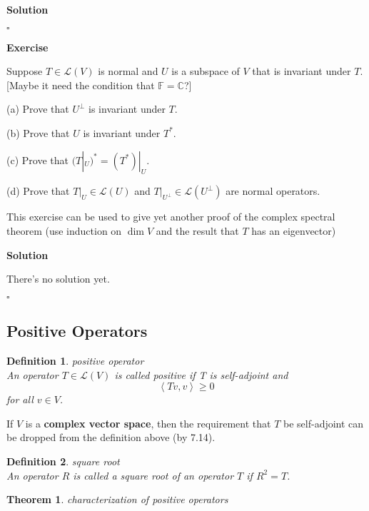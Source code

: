 \documentclass{article}
\newtheorem{theorem}{Theorem}[subsection]
\newtheorem{definition}{Definition}[subsection]
\newenvironment{exercise}{%
{\textbf{Exercise\\}
    }
}{
}
\newenvironment{solution}{%
{
    \textbf{Solution\\}
    }
}{
  \hfill $\square$ 
  \par\bigskip 
}
\newcommand{\CC}{\mathbb{C}}
\newcommand{\FF}{\mathbb{F}}
\begin{document}
\begin{CJK}{UTF8}{gkai}
\begin{solution}
\end{solution}

\begin{exercise}
    Suppose $T \in \mathcal{L}(V)$ is normal and $U$ is a subspace of $V$ that is invariant under $T$. [Maybe it need the condition that $\FF = \CC$?]

    (a) Prove that $U^\bot$ is invariant under $T$.

    (b) Prove that $U$ is invariant under $T^\ast$.

    (c) Prove that $(T|_U)^\ast = (T^\ast)|_U$.

    (d) Prove that $T|_U \in \mathcal{L}(U)$ and $T|_{U^\bot} \in  \mathcal{L}(U^\bot)$ are normal operators.

    This exercise can be used to give yet another proof of the complex spectral theorem (use induction on $\dim V$ and the result that $T$ has an eigenvector)
\end{exercise}

\begin{solution}
There's no solution yet.

\end{solution}

\subsection{Positive Operators}

\begin{definition}
    positive operator\\

    An operator $T \in \mathcal{L}(V)$ is called positive if T is self-adjoint and
    \[\left<Tv,v\right> \geq 0\]
    for all $v \in V$.
\end{definition}

If $V$ is a \textbf{complex vector space}, then the requirement that $T$ be self-adjoint can be dropped from the definition above (by 7.14).

\begin{definition}
    square root\\

    An operator $R$ is called a square root of an operator $T$ if $R^2 = T$.
\end{definition}

\begin{theorem}
    characterization of positive operators\\


\end{theorem}
\end{CJK}
\end{document}
